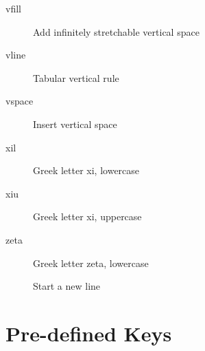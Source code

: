 \begin{small}
\begin{description}
\item[\bs vfill]          Add infinitely stretchable vertical space
\item[\bs vline]          Tabular vertical rule
\item[\bs vspace]         Insert vertical space
\item[\bs xi\us l]           Greek letter xi, lowercase
\item[\bs xi\us u]           Greek letter xi, uppercase
\item[\bs zeta]           Greek letter zeta, lowercase
\item[\bs \bs]              Start a new line
\end{description}
\end{small}

\newpage
\section{Pre-defined Keys} \label{keydefs}

